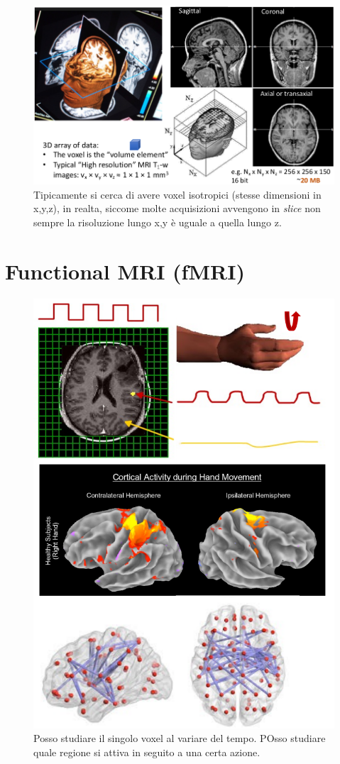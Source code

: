 \begin{figure}[ht]
	\centering
	\includegraphics[width=0.8\linewidth]{figure_med/t1}
	\caption{Tipicamente si cerca di avere voxel isotropici (stesse dimensioni in x,y,z), in realta, siccome molte acquisizioni avvengono in \textit{slice} non sempre la risoluzione lungo x,y è uguale a quella lungo z.}
\end{figure}
\FloatBarrier

\newpage

\section{Functional MRI (fMRI)}


\begin{figure}[ht]
	\centering
	\includegraphics[width=0.65\linewidth]{figure_med/fmri}
	\caption{Posso studiare il singolo voxel al variare del tempo. POsso studiare quale regione si attiva in seguito a una certa azione.}
\end{figure}
\FloatBarrier

